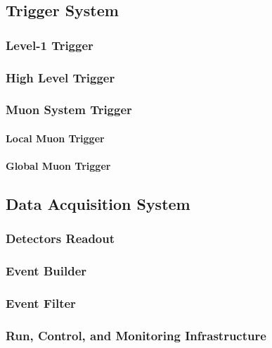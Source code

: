         \subsection{Trigger System}

            \subsubsection{Level-1 Trigger}

            \subsubsection{High Level Trigger}

            \subsubsection{Muon System Trigger}

                \paragraph{Local Muon Trigger}

                \paragraph{Global Muon Trigger}

        \subsection{Data Acquisition System}

            \subsubsection{Detectors Readout}

            \subsubsection{Event Builder}

            \subsubsection{Event Filter}

            \subsubsection{Run, Control, and Monitoring Infrastructure}


